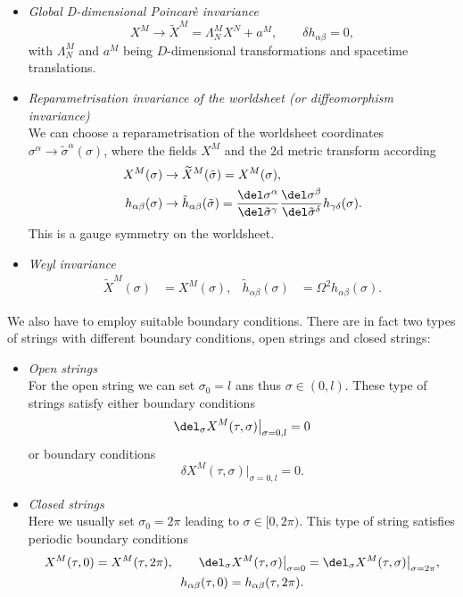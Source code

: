 \begin{itemize}
\item\textit{Global D-dimensional Poincarè invariance} 
%
\begin{equation}
X^{M} \rightarrow \widetilde{X}^{M} = \Lambda_{N}^{M} X^{N} + a^{M}, \qquad \delta	h_{\alpha\beta} = 0,
\end{equation}
%
with $\Lambda_{N}^{M}$ and $a^{M}$ being $D$-dimensional  transformations and spacetime translations.
%
%
\item\textit{Reparametrisation invariance of the worldsheet (or diffeomorphism invariance)}\\
We can choose a reparametrisation of the worldsheet coordinates $\sigma^{\alpha}\rightarrow \tilde{\sigma}^{\alpha}(\sigma)$, where the fields $X^{M}$ and the 2d metric transform according
%
\begin{equation}
\begin{alignedat}{3}
X^{M}(\sigma) &\rightarrow \widetilde{X}^{M}(\tilde{\sigma}) = X^{M}(\sigma), \\
h_{\alpha\beta}(\sigma) &\rightarrow \tilde{h}_{\alpha\beta}(\tilde{\sigma}) = \frac{\del \sigma^{\alpha}}{\del \tilde{\sigma}^{\gamma}} \frac{\del \sigma^{\beta}}{\del \tilde{\sigma}^{\delta}}h_{\gamma\delta}(\sigma).
\end{alignedat}
\end{equation}
%
This is a gauge symmetry on the worldsheet.
%
%
\item\textit{Weyl invariance} 
\begin{align}
\widetilde{X}^{M}(\sigma) &= X^{M}(\sigma), &  \tilde{h}_{\alpha\beta}(\sigma)&=\Omega^{2}h_{\alpha\beta}(\sigma).
\end{align}
\end{itemize}
%
%
We also have to employ suitable boundary conditions. There are in fact two types of strings with different boundary conditions, open strings and closed strings:
%
%
\begin{itemize}
\item \textit{Open strings}\\
For the open string we can set $\sigma_{0}=l$ ans thus $\sigma\in (0,l)$. These type of strings satisfy either   boundary conditions
%
\begin{equation}
\del_{\sigma}X^{M}(\tau,\sigma)\big\vert_{\sigma=0,l} = 0
\end{equation}
%
or  boundary conditions
%
\begin{equation}
\delta X^{M}(\tau,\sigma)\big\vert_{\sigma=0,l}=0.
\end{equation}
%
%
\item \textit{Closed strings}\\
Here we usually set $\sigma_{0}=2\pi$ leading to $\sigma\in [0,2\pi)$. This type of string satisfies periodic boundary conditions
%
\begin{gather}
X^{M}(\tau,0)=X^{M}(\tau,2\pi), \qquad \del_{\sigma}X^{M}(\tau	,\sigma)\big\vert_{\sigma=0} = \del_{\sigma}X^{M}(\tau	,\sigma)\big\vert_{\sigma=2\pi}, \notag\\ h_{\alpha\beta}(\tau,0)=h_{\alpha\beta}(\tau,2\pi).
\end{gather}
\end{itemize}
